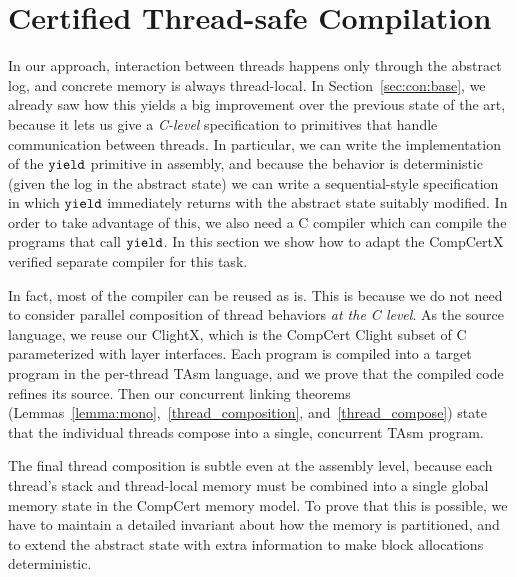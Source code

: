 
\section{Certified Thread-safe Compilation}
\label{sec:comp}

In our approach, interaction between threads happens only through the 
abstract log, and concrete memory is always thread-local.
In Section~\ref{sec:con:base}, we already saw how this yields a big
improvement over the previous state of the art, because it lets us
give a \emph{C-level} specification to primitives that handle
communication between threads. In particular, we can write the
implementation of the ${\texttt{yield}}$ primitive in assembly, and because the
behavior is deterministic (given the log in the abstract state) we can
write a sequential-style specification in which ${\texttt{yield}}$ immediately
returns with the abstract state suitably modified.
In order to take advantage of this, we also need a C compiler which
can compile the programs that call ${\texttt{yield}}$. 
In this section we show how to adapt the CompCertX verified
separate compiler for this task.

In fact, most of the compiler can be reused as is. This is because we
do not need to consider parallel composition of thread behaviors
\emph{at the C level}. As the source language, we reuse our
ClightX, which is the CompCert
Clight subset of C parameterized with layer interfaces.
Each program is compiled into a
target program in the per-thread TAsm language, and we prove that the
compiled code refines its source. Then our concurrent linking
theorems (Lemmas~\ref{lemma:mono},~\ref{thread_composition}, and~\ref{thread_compose})
state that the individual threads compose into a
single, concurrent TAsm program. %

The final thread composition is subtle even at the assembly level,
because each thread's stack and thread-local memory must be combined
into a single global memory state in the CompCert memory model. To
prove that this is possible, we have to maintain a detailed invariant
about how the memory is partitioned, and to extend the abstract state
with extra information to make block allocations deterministic.


